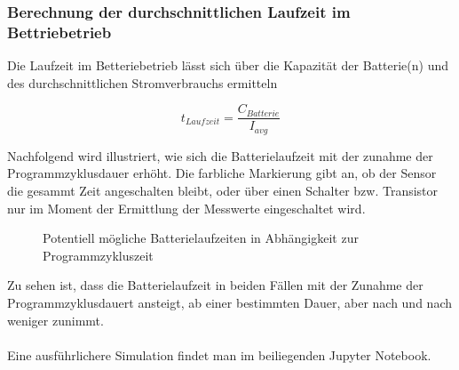 \subsubsection{Berechnung der durchschnittlichen Laufzeit im Bettriebetrieb}

Die Laufzeit im Betteriebetrieb lässt sich über die Kapazität der Batterie(n) und des durchschnittlichen Stromverbrauchs ermitteln

\[t_{Laufzeit} = \frac{C_{Batterie}}{I_{avg}}\]

Nachfolgend wird illustriert, wie sich die Batterielaufzeit mit der zunahme der Programmzyklusdauer erhöht. Die farbliche Markierung gibt an, ob der Sensor die gesammt Zeit angeschalten bleibt, oder über einen Schalter bzw. Transistor nur im Moment der Ermittlung der Messwerte eingeschaltet wird.

\begin{center}
	\begin{figure}[h]
	 
	 \noindent{}
	 \caption[Potentiell mögliche Batterielaufzeiten in Abhängigkeit zur Programmzykluszeit]{Potentiell mögliche Batterielaufzeiten in Abhängigkeit zur Programmzykluszeit}
	 \label{fig:batterielaufzeit}
	\end{figure}
\end{center}

Zu sehen ist, dass die Batterielaufzeit in beiden Fällen mit der Zunahme der Programmzyklusdauert ansteigt, ab einer bestimmten Dauer, aber nach und nach weniger zunimmt.\\\\
Eine ausführlichere Simulation findet man im beiliegenden Jupyter Notebook.

\newpage
